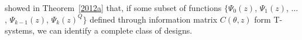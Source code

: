 \documentclass[11pt]{amsart}
\theoremstyle{definition}
\theoremstyle{remark}
\numberwithin{equation}{section}
\begin{document}
      
      
\cite{yang2012} showed in Theorem~\ref{2012a} that, if some subset of functions $\{\Psi_0(z)$, $\Psi_1(z)$, $\ldots$, $\Psi_{k-1}(z)$, $\Psi_k(z)^Q\}$ defined through information matrix $C(\theta,z)$ form T-systems, we can identify a complete class of designs.
\end{document}
